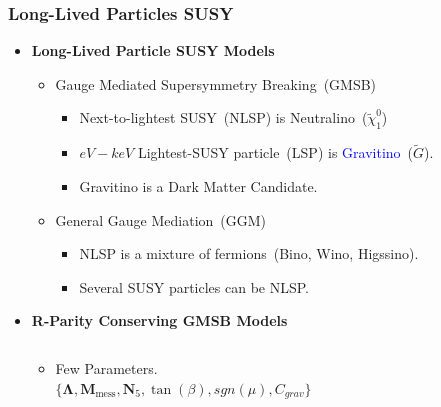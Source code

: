 \documentclass{beamer}
\begin{document}
\begin{frame}
\frametitle{Long-Lived Particles SUSY}
\begin{minipage}{.8\paperwidth} 
     \begin{itemize}  
       \item{\color{UMN@Maroon} \textbf{Long-Lived Particle SUSY Models}}
      \large{
        \begin{itemize}
        \item Gauge Mediated Supersymmetry Breaking~(GMSB)
          \begin{itemize}
            \item Next-to-lightest SUSY~(NLSP) is \alert{Neutralino}~($\tilde{\chi}^{0}_{1}$)
            \item $eV-keV$ Lightest-SUSY particle~(LSP) is \textcolor{blue}{Gravitino}~($\tilde{G}$).
            \item Gravitino is a Dark Matter Candidate.
          \end{itemize}
        \item General Gauge Mediation~(GGM)
          \begin{itemize}
            \item NLSP is a mixture of fermions~(Bino, Wino, Higssino).
            \item Several SUSY particles can be NLSP.
          \end{itemize}
      \end{itemize}
    } 
    \end{itemize}
    \end{minipage}
    
 \begin{minipage}[b]{\linewidth} 
 \begin{itemize} 
  \item{ \color{UMN@Maroon} \textbf{R-Parity Conserving GMSB Models}}    

  \begin{columns}
    \begin{column}{0.70\linewidth} 
           \begin{itemize}
             \item Few Parameters.\\
             $\{ \mathbf{\Lambda},\mathbf{M}_{\mbox{mess}}, \mathbf{N}_{5}, \tan(\beta),  sgn(\mu), C_{grav} \} $ 
            

\end{itemize}
\end{column}
\end{columns}
\end{itemize}
\end{minipage}
\end{frame}
\end{document}
